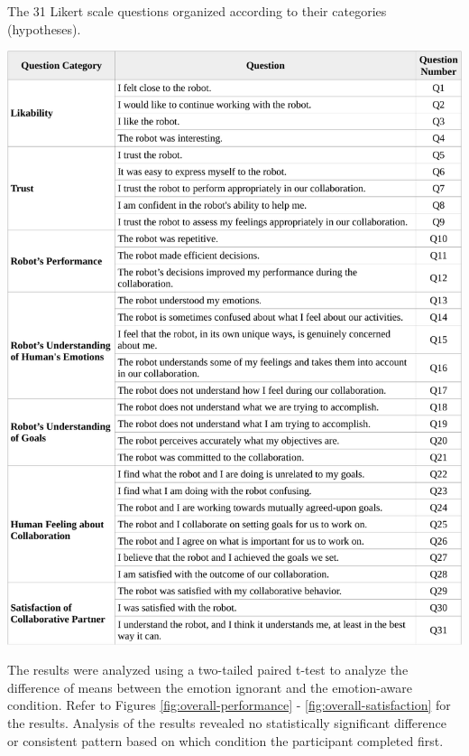\documentclass[12pt]{report}
\begin{document}
\begin{table}
 \centering
 \caption{The 31 Likert scale questions organized according to their
 categories (hypotheses).}
 \label{fig:31questions-table}
 \includegraphics[width=1\textwidth]{figure/table1-croped.pdf}
\end{table}
\clearpage

The results were analyzed using a two-tailed paired t-test to analyze the
difference of means between the emotion ignorant and the emotion-aware
condition. Refer to Figures \ref{fig:overall-performance} -
\ref{fig:overall-satisfaction} for the results. Analysis of the results revealed
no statistically significant difference or consistent pattern based on which
condition the participant completed first.
\end{document}
